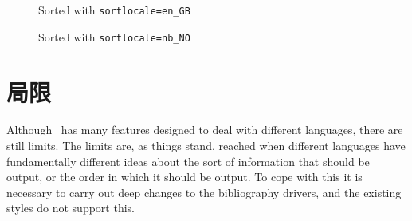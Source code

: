 \begin{figure}
\caption{Sorted with \texttt{sortlocale=en\_GB}\label{zebra:en}}
\end{figure}

\begin{figure}
\caption{Sorted with \texttt{sortlocale=nb\_NO}\label{zebra:no}}
\end{figure}

\section{局限}
Although \biblatex\ has many features designed to deal with different
languages, there are still limits. The limits are, as things stand,
reached when different languages have fundamentally different ideas
about the sort of information that should be output, or the order in
which it should be output. To cope with this it is necessary to carry
out deep changes to the bibliography drivers, and the existing styles
do not support this.


